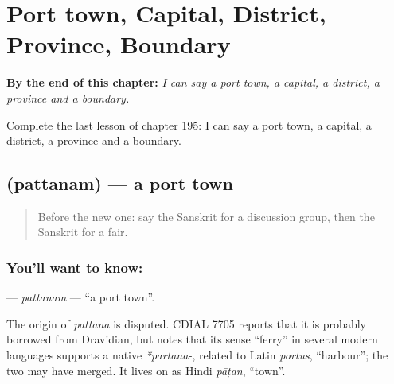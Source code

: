 
\chapter{Port town, Capital, District, Province, Boundary}
\label{ch:sa-port-town-capital-district-province-boundary}

\begin{chapteropening}
\textbf{By the end of this chapter:} \emph{I can say a port town, a capital, a district, a province and a boundary.}

Complete the last lesson of chapter 195: I can say a port town, a capital, a district, a province and a boundary.
\end{chapteropening}

\section[\texorpdfstring{\sk{पत्तनम्} (pattanam)}{पत्तनम् (pattanam)}]{ (pattanam) — a port town}

\label{lesson:SA-C195-pattanam}



\begin{quote}
Before the new one: say the Sanskrit for a discussion group, then the Sanskrit for a fair.
\end{quote}

\subsection*{You'll want to know: }
\textbf{} — \emph{pattanam} — \textquotedblleft{}a port town\textquotedblright{}.

\begin{cousinweb}
The origin of \emph{pattana} is disputed. CDIAL 7705 reports that it is probably borrowed from Dravidian, but notes that its sense \textquotedblleft{}ferry\textquotedblright{} in several modern languages supports a native \emph{*partana-}, related to Latin \emph{portus}, \textquotedblleft{}harbour\textquotedblright{}; the two may have merged. It lives on as Hindi \emph{pāṭan}, \textquotedblleft{}town\textquotedblright{}.
\end{cousinweb}

